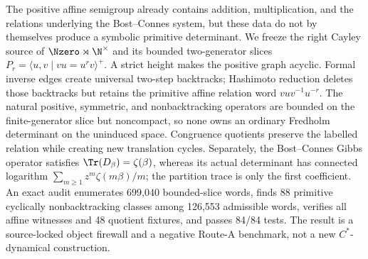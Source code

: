 The positive affine semigroup already contains addition, multiplication, and
the relations underlying the Bost--Connes system, but these data do not by
themselves produce a symbolic primitive determinant.  We freeze the right
Cayley source of
$\Nzero\rtimes\N^{\times}$ and its bounded two-generator slices
$P_r=\langle u,v\mid vu=u^rv\rangle^+$.  A strict height makes the positive
graph acyclic.  Formal inverse edges create universal two-step backtracks;
Hashimoto reduction deletes those backtracks but retains the primitive affine
relation word $vuv^{-1}u^{-r}$.  The natural positive, symmetric, and
nonbacktracking operators are bounded on the finite-generator slice but
noncompact, so none owns an ordinary Fredholm determinant on the uninduced
space.  Congruence quotients preserve the labelled relation while creating
new translation cycles.  Separately, the Bost--Connes Gibbs operator satisfies
$\Tr(D_\beta)=\zeta(\beta)$, whereas its actual determinant has connected
logarithm $\sum_{m\ge1}z^m\zeta(m\beta)/m$; the partition trace is only the
first coefficient.  An exact audit enumerates 699,040 bounded-slice words,
finds 88 primitive cyclically nonbacktracking classes among 126,553 admissible
words, verifies all affine witnesses and 48 quotient fixtures, and passes
84/84 tests.  The result is a source-locked object firewall and a negative
Route-A benchmark, not a new $C^*$-dynamical construction.
